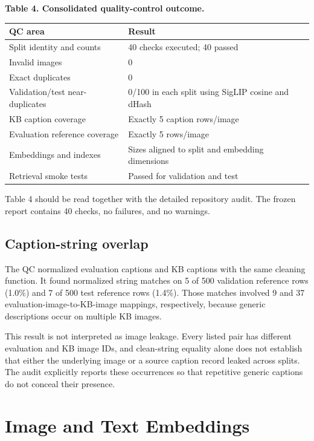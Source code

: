 \documentclass{article}
\begin{document}
\begin{center}
\textbf{Table 4. Consolidated quality-control outcome.}
\end{center}
\label{tab:qc}

\begin{table}[htbp]
\centering
\begin{tabular}{lp{9.2cm}}
\toprule
QC area & Result \\
\midrule
Split identity and counts & 40 checks executed; 40 passed \\
Invalid images & 0 \\
Exact duplicates & 0 \\
Validation/test near-duplicates & 0/100 in each split using SigLIP cosine and dHash \\
KB caption coverage & Exactly 5 caption rows/image \\
Evaluation reference coverage & Exactly 5 rows/image \\
Embeddings and indexes & Sizes aligned to split and embedding dimensions \\
Retrieval smoke tests & Passed for validation and test \\
\bottomrule
\end{tabular}
\end{table}

Table 4 should be read together with the detailed repository audit. The
frozen report contains 40 checks, no failures, and no warnings.

\subsection{Caption-string overlap}\label{caption-string-overlap}

The QC normalized evaluation captions and KB captions with the same
cleaning function. It found normalized string matches on 5 of 500
validation reference rows (1.0\%) and 7 of 500 test reference rows
(1.4\%). Those matches involved 9 and 37 evaluation-image-to-KB-image
mappings, respectively, because generic descriptions occur on multiple
KB images.

This result is not interpreted as image leakage. Every listed pair has
different evaluation and KB image IDs, and clean-string equality alone
does not establish that either the underlying image or a source caption
record leaked across splits. The audit explicitly reports these
occurrences so that repetitive generic captions do not conceal their
presence.

\section{Image and Text Embeddings}\label{image-and-text-embeddings}
\end{document}
